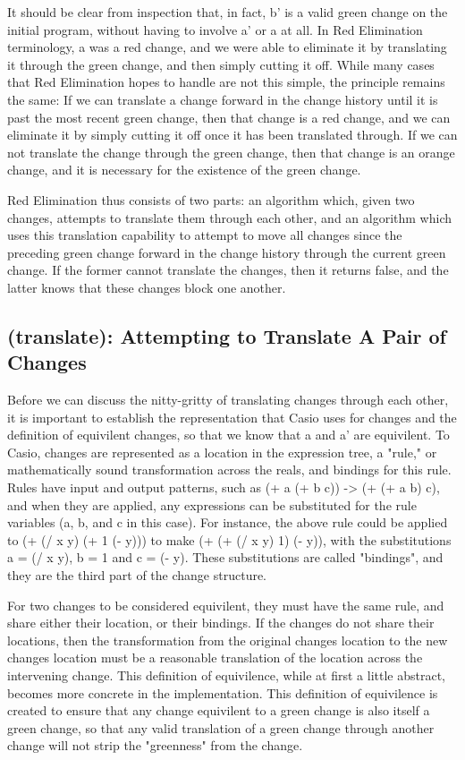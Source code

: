 \documentclass{article}
\begin{document}
It should be clear from inspection that, in fact, 
b' is a valid green change on the initial program, 
without having to involve a' or a at all. 
In Red Elimination terminology, 
a was a red change, 
and we were able to eliminate it 
by translating it through the green change, 
and then simply cutting it off. 
While many cases that Red Elimination hopes to handle 
are not this simple, 
the principle remains the same: 
If we can translate a change 
forward in the change history 
until it is past the most recent green change, 
then that change is a red change, 
and we can eliminate it by simply cutting it off 
once it has been translated through. 
If we can not translate the change through the green change, 
then that change is an orange change, 
and it is necessary for the existence of the green change.

Red Elimination thus consists of two parts: 
an algorithm which, given two changes, 
attempts to translate them through each other, 
and an algorithm which uses this translation capability 
to attempt to move all changes since the preceding green change 
forward in the change history 
through the current green change. 
If the former cannot translate the changes, 
then it returns false, 
and the latter knows that these changes block one another.

\subsection{(translate): Attempting to Translate A Pair of Changes}

Before we can discuss the nitty-gritty of translating changes through each other, 
it is important to establish the representation that Casio uses for changes 
and the definition of equivilent changes, 
so that we know that a and a' are equivilent. 
To Casio, changes are represented as a location in the expression tree, 
a "rule," or mathematically sound transformation across the reals, 
and bindings for this rule. 
Rules have input and output patterns, 
such as (+ a (+ b c)) -> (+ (+ a b) c), 
and when they are applied, 
any expressions can be substituted for the rule variables 
(a, b, and c in this case). 
For instance, 
the above rule could be applied 
to (+ (/ x y) (+ 1 (- y))) 
to make (+ (+ (/ x y) 1) (- y)), 
with the substitutions a = (/ x y), b = 1 and c = (- y). 
These substitutions are called "bindings", 
and they are the third part of the change structure.

For two changes to be considered equivilent, 
they must have the same rule, 
and share either their location, 
or their bindings. 
If the changes do not share their locations, 
then the transformation from the original changes location 
to the new changes location must be a reasonable translation 
of the location across the intervening change. 
This definition of equivilence, 
while at first a little abstract, 
becomes more concrete in the implementation. 
This definition of equivilence is created to ensure 
that any change equivilent to a green change 
is also itself a green change, 
so that any valid translation of a green change 
through another change 
will not strip the "greenness" from the change.
\end{document}
